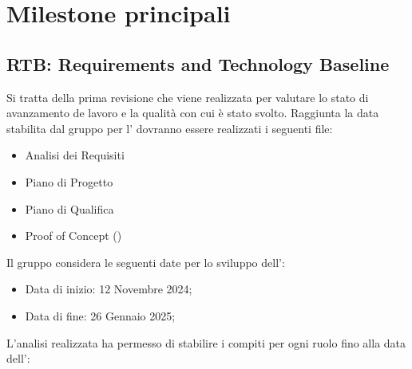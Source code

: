\section{Milestone principali}
\label{sec:milestone_principali}
\subsection{RTB: Requirements and Technology Baseline}
Si tratta della prima revisione che viene realizzata per valutare lo stato di avanzamento de lavoro e la qualità con cui è stato svolto.
Raggiunta la data stabilita dal gruppo per l' dovranno essere realizzati i seguenti file:

\begin{itemize}
\item Analisi dei Requisiti
\item Piano di Progetto
\item Piano di Qualifica
\item Proof of Concept ()
\end{itemize}
Il gruppo considera le seguenti date per lo sviluppo dell':
\begin{itemize}
    \item Data di inizio: 12 Novembre 2024;
    \item Data di fine: 26 Gennaio 2025;
\end{itemize}
L'analisi realizzata ha permesso di stabilire i compiti per ogni ruolo fino alla data dell':
